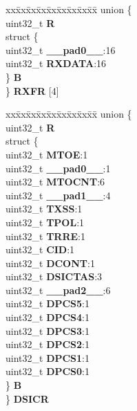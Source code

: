 \begin{DoxyCompactItemize}
\begin{tabbing}
\end{tabbing}\item 
\mbox{\label{structDSPI__tag_a6e862341c606046fb4a9cfbbae018b4a}} 
\begin{tabbing}
xx\=xx\=xx\=xx\=xx\=xx\=xx\=xx\=xx\=\kill
union \{\\
\>uint32\_t {\bfseries R}\\
\>struct \{\\
\>\>uint32\_t {\bfseries \_\_pad0\_\_}:16\\
\>\>uint32\_t {\bfseries RXDATA}:16\\
\>\} {\bfseries B}\\
\} {\bfseries RXFR} \mbox{[}4\mbox{]}\\

\end{tabbing}\item 
\mbox{\label{structDSPI__tag_a9138c9cd78d3edccba0d4202009a2b6a}} 
\begin{tabbing}
xx\=xx\=xx\=xx\=xx\=xx\=xx\=xx\=xx\=\kill
union \{\\
\>uint32\_t {\bfseries R}\\
\>struct \{\\
\>\>uint32\_t {\bfseries MTOE}:1\\
\>\>uint32\_t {\bfseries \_\_pad0\_\_}:1\\
\>\>uint32\_t {\bfseries MTOCNT}:6\\
\>\>uint32\_t {\bfseries \_\_pad1\_\_}:4\\
\>\>uint32\_t {\bfseries TXSS}:1\\
\>\>uint32\_t {\bfseries TPOL}:1\\
\>\>uint32\_t {\bfseries TRRE}:1\\
\>\>uint32\_t {\bfseries CID}:1\\
\>\>uint32\_t {\bfseries DCONT}:1\\
\>\>uint32\_t {\bfseries DSICTAS}:3\\
\>\>uint32\_t {\bfseries \_\_pad2\_\_}:6\\
\>\>uint32\_t {\bfseries DPCS5}:1\\
\>\>uint32\_t {\bfseries DPCS4}:1\\
\>\>uint32\_t {\bfseries DPCS3}:1\\
\>\>uint32\_t {\bfseries DPCS2}:1\\
\>\>uint32\_t {\bfseries DPCS1}:1\\
\>\>uint32\_t {\bfseries DPCS0}:1\\
\>\} {\bfseries B}\\
\} {\bfseries DSICR}\\


\end{tabbing}
\end{DoxyCompactItemize}
